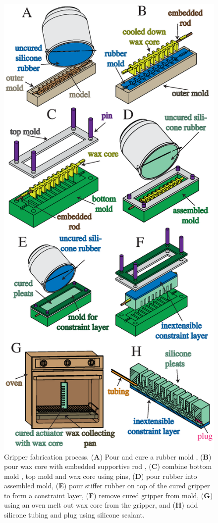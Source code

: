 \begin{figure}[!ht]
\centering
   \includegraphics[width=0.85\columnwidth]{figures/robotic_gripper/fabrication_upright.eps} %
      \caption{Gripper fabrication process. (\textbf{A}) Pour and cure a rubber mold , (\textbf{B}) pour wax core  with embedded supportive rod , (\textbf{C}) combine bottom mold , top mold  and wax core using pins, (\textbf{D}) pour  rubber  into assembled mold, (\textbf{E}) pour stiffer rubber  on top of the cured gripper  to form a constraint layer, (\textbf{F}) remove cured gripper from mold, (\textbf{G}) using an oven melt out wax core from the gripper, and (\textbf{H}) add silicone tubing and plug using silicone sealant. }
      \label{fig:fabrication}
\end{figure}

